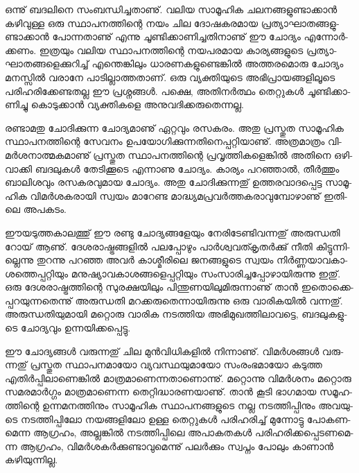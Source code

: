 ഒ­ന്നു് ബദ­ലി­നെ സം­ബ­ന്ധി­ച്ച­താ­ണു്. വലിയ സാ­മൂ­ഹിക ചല­ന­ങ്ങ­ളു­ണ്ടാ­ക്കാന്‍ കഴി­വു­ള്ള ഒരു സ്ഥാ­പ­ന­ത്തി­ന്റെ നയം ചില ദോ­ഷ­ക­ര­മായ 
പ്ര­ത്യാ­ഘാ­ത­ങ്ങ­ളു­ണ്ടാ­ക്കാന്‍ പോ­ന്ന­താ­ണു് എന്നു ചൂ­ണ്ടി­ക്കാ­ണി­ച്ച­തി­നാ­ണു് ഈ ചോ­ദ്യം എന്നോര്‍­ക്ക­ണം. ഇത്ര­യും വലിയ സ്ഥാ­പ­ന­ത്തി­ന്റെ
 നയ­പ­ര­മായ കാ­ര്യ­ങ്ങ­ളു­ടെ പ്ര­ത്യാ­ഘാ­ത­ങ്ങ­ളെ­ക്കു­റി­ച്ച് എന്തെ­ങ്കി­ലും ധാ­ര­ണ­ക­ളു­ണ്ടെ­ങ്കില്‍ അത്ത­ര­മൊ­രു ചോ­ദ്യം മന­സ്സില്‍ വരാ­നേ പാ­ടി­ല്ലാ­ത്ത­താ­ണ്. 
 ഒരു വ്യ­ക്തി­യു­ടെ അഭി­പ്രാ­യ­ങ്ങ­ളി­ലൂ­ടെ പരി­ഹ­രി­ക്കേ­ണ്ട­ത­ല്ല ഈ പ്ര­ശ്ന­ങ്ങള്‍. പക്ഷെ, അതി­നര്‍­ത്ഥം തെ­റ്റു­കള്‍ ചൂ­ണ്ടി­ക്കാ­ണി­ച്ചു കൊ­ടു­ക്കാന്‍ വ്യ­ക്തി­ക­ളെ അനു­വ­ദി­ക്ക­രു­തെ­ന്ന­ല്ല.

­ര­ണ്ടാ­മ­തു ചോ­ദി­ക്കു­ന്ന ചോ­ദ്യ­മാ­ണു് ഏറ്റ­വും രസ­ക­രം. അതു പ്ര­സ്തുത സാ­മൂ­ഹിക സ്ഥാ­പ­ന­ത്തി­ന്റെ സേ­വ­നം ഉപ­യോ­ഗി­ക്കു­ന്ന­തി­നെ­പ്പ­റ്റി­യാ­ണു്.
 അത്ര­മാ­ത്രം വി­മര്‍­ശ­നാ­ത്മ­ക­മാ­ണു് പ്ര­സ്തുത സ്ഥാ­പ­ന­ത്തി­ന്റെ പ്ര­വൃ­ത്തി­ക­ളെ­ങ്കില്‍ അതി­നെ ഒഴി­വാ­ക്കി ബദ­ലു­കള്‍ തേ­ടി­ക്കൂ­ടെ എന്നാ­ണു ചോ­ദ്യം.
  കാ­ര്യം പറ­ഞ്ഞാല്‍, തീര്‍­ത്തും ബാ­ലി­ശ­വും രസ­ക­ര­വു­മായ ചോ­ദ്യം. അതു ചോ­ദി­ക്കു­ന്ന­തു് ഉത്ത­ര­വാ­ദ­പ്പെ­ട്ട സാ­മൂ­ഹിക വി­മര്‍­ശ­ക­രാ­യി 
  സ്വ­യം മാ­റേ­ണ്ട മാ­ദ്ധ്യ­മ­പ്ര­വര്‍­ത്ത­ക­രാ­വു­മ്പോ­ഴാ­ണു് ഇതി­ലെ അപ­ക­ടം­.

ഈ­യ­ടു­ത്ത­കാ­ല­ത്തു് ഈ രണ്ടു ചോ­ദ്യ­ങ്ങ­ളേ­യും നേ­രി­ടേ­ണ്ടി­വ­ന്ന­തു് അ­രു­ന്ധ­തി റോ­യ് ആണു്. ദേ­ശ­രാ­ഷ്ട്ര­ങ്ങ­ളില്‍ പല­പ്പോ­ഴും 
പാര്‍­ശ്വ­വ­ത്കൃ­തര്‍­ക്കു് നീ­തി കി­ട്ടു­ന്നി­ല്ലെ­ന്നു തു­റ­ന്നു പറ­ഞ്ഞ അവര്‍ കാ­ശ്മീ­രി­ലെ ജന­ങ്ങ­ളു­ടെ സ്വ­യം നിര്‍­ണ്ണ­യാ­വ­കാ­ശ­ത്തെ­പ്പ­റ്റി­യും
 മനു­ഷ്യാ­വ­കാ­ശ­ങ്ങ­ളെ­പ്പ­റ്റി­യും സം­സാ­രി­ച്ച­പ്പോ­ഴാ­യി­രു­ന്നു ഇതു്. ഒരു ദേ­ശ­രാ­ഷ്ട്ര­ത്തി­ന്റെ സു­ര­ക്ഷ­യി­ലും പി­ന്തു­ണ­യി­ലു­മി­രു­ന്നാ­ണു് 
 താന്‍ ഇതൊ­ക്കെ­പ്പ­റ­യു­ന്ന­തെ­ന്നു് അരു­ന്ധ­തി മറ­ക്ക­രു­തെ­ന്നാ­യി­രു­ന്നു ഒരു വാ­രി­ക­യില്‍ വന്ന­തു്. അരു­ന്ധ­തി­യു­മാ­യി മറ്റൊ­രു 
 വാ­രിക നട­ത്തിയ അഭി­മു­ഖ­ത്തി­ലാ­വ­ട്ടെ, ബദ­ലു­ക­ളു­ടെ ചോ­ദ്യ­വും ഉന്ന­യി­ക്ക­പ്പെ­ട്ടു­.

ഈ ചോ­ദ്യ­ങ്ങള്‍ വരു­ന്ന­തു് ചില മുന്‍­വി­ധി­ക­ളില്‍ നി­ന്നാ­ണു്. വി­മര്‍­ശ­ങ്ങള്‍ വരു­ന്ന­തു് പ്ര­സ്തുത സ്ഥാ­പ­ന­മാ­യോ വ്യ­വ­സ്ഥ­യു­മാ­യോ
 സം­രം­ഭ­മാ­യോ കടു­ത്ത എതിര്‍­പ്പി­ലാ­ണെ­ങ്കില്‍ മാ­ത്ര­മാ­ണെ­ന്ന­താ­ണൊ­ന്നു്. മറ്റൊ­ന്നു വി­മര്‍­ശ­നം മറ്റൊ­രു സമ­ര­മാര്‍­ഗ്ഗം
  മാ­ത്ര­മാ­ണെ­ന്ന തെ­റ്റി­ദ്ധാ­ര­ണ­യാ­ണു്. താന്‍ കൂ­ടി ഭാ­ഗ­മായ സമൂ­ഹ­ത്തി­ന്റെ ഉന്ന­മ­ന­ത്തി­നും സാ­മൂ­ഹിക സ്ഥാ­പ­ന­ങ്ങ­ളു­ടെ നല്ല 
  നട­ത്തി­പ്പി­നും അവ­യു­ടെ നട­ത്തി­പ്പി­ലോ നയ­ങ്ങ­ളി­ലോ ഉള്ള തെ­റ്റു­കള്‍ പരി­ഹ­രി­ച്ച് മു­ന്നോ­ട്ടു പോ­ക­ണ­മെ­ന്ന ആഗ്ര­ഹം, അല്ല­ങ്കില്‍ 
  നട­ത്തി­പ്പി­ലെ അപാ­ക­ത­കള്‍ പരി­ഹ­രി­ക്ക­പ്പെ­ട­ണ­മെ­ന്ന ആഗ്ര­ഹം, വി­മര്‍­ശ­കര്‍­ക്കു­ണ്ടാ­വു­മെ­ന്നു് പലര്‍­ക്കും സ്വ­പ്നം പോ­ലും കാ­ണാന്‍ 
  കഴി­യു­ന്നി­ല്ല.

